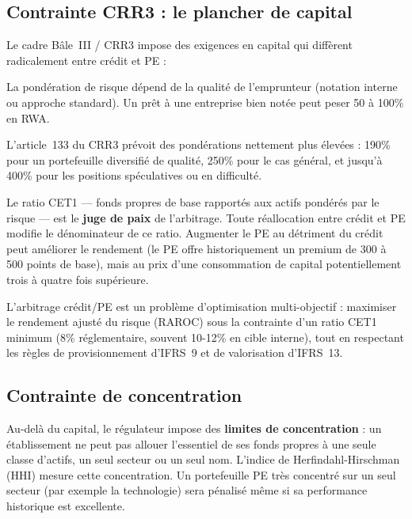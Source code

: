 \documentclass[12pt,a4paper]{article}
\begin{document}
\subsection{Contrainte CRR3 : le plancher de capital}

Le cadre Bâle~III / CRR3 impose des exigences en capital qui diffèrent radicalement entre crédit et PE :

\begin{description}[style=nextline, leftmargin=1.5cm]
  \item[Crédit classique] La pondération de risque dépend de la qualité de l'emprunteur (notation interne ou approche standard). Un prêt à une entreprise bien notée peut peser 50 à 100\% en RWA.
  \item[Private equity] L'article~133 du CRR3 prévoit des pondérations nettement plus élevées : 190\% pour un portefeuille diversifié de qualité, 250\% pour le cas général, et jusqu'à 400\% pour les positions spéculatives ou en difficulté.
\end{description}

Le ratio CET1 --- fonds propres de base rapportés aux actifs pondérés par le risque --- est le \textbf{juge de paix} de l'arbitrage. Toute réallocation entre crédit et PE modifie le dénominateur de ce ratio. Augmenter le PE au détriment du crédit peut améliorer le rendement (le PE offre historiquement un premium de 300 à 500 points de base), mais au prix d'une consommation de capital potentiellement trois à quatre fois supérieure.

\begin{keypoint}
L'arbitrage crédit/PE est un problème d'optimisation multi-objectif : maximiser le rendement ajusté du risque (RAROC) sous la contrainte d'un ratio CET1 minimum (8\% réglementaire, souvent 10-12\% en cible interne), tout en respectant les règles de provisionnement d'IFRS~9 et de valorisation d'IFRS~13.
\end{keypoint}

\subsection{Contrainte de concentration}

Au-delà du capital, le régulateur impose des \textbf{limites de concentration} : un établissement ne peut pas allouer l'essentiel de ses fonds propres à une seule classe d'actifs, un seul secteur ou un seul nom. L'indice de Herfindahl-Hirschman (HHI) mesure cette concentration. Un portefeuille PE très concentré sur un seul secteur (par exemple la technologie) sera pénalisé même si sa performance historique est excellente.
\end{document}
